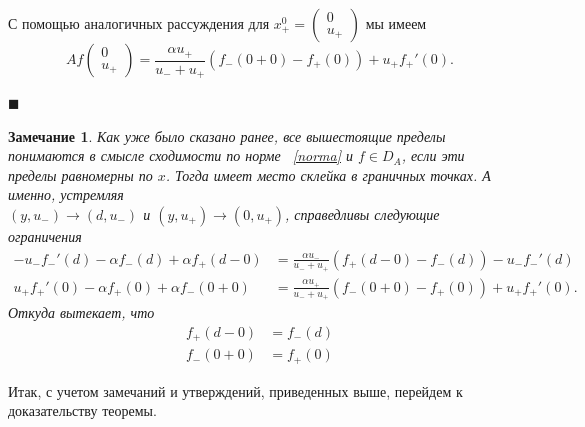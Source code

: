 \documentclass[12pt,a4paper]{article}
\newtheorem{zam}{Замечание}
\begin{document}
С помощью аналогичных рассуждения для $x_+^0 = \begin{pmatrix}
 0 \\
 u_+
\end{pmatrix}$ мы имеем
$$A f \begin{pmatrix}
 0 \\
 u_+
\end{pmatrix} = \frac{\alpha u_+}{u_- + u_+} (f_- (0 + 0) - f_+ (0)) + u_+ f_+' (0).$$
\begin{flushright}
$\blacksquare$
\end{flushright}

\begin{zam}
Как уже было сказано ранее, все вышестоящие пределы понимаются в смысле сходимости по норме ~\eqref{norma} и $f \in D_A$, если эти пределы равномерны по $x$. Тогда имеет место склейка в граничных точках. А именно, устремляя\\ $(y, u_-) \to (d, u_-)$ и
$(y, u_+) \to (0, u_+)$, справедливы следующие ограничения
\begin{equation*}
\begin{aligned} 
  -u_- f_-' (d) - \alpha f_- (d) + \alpha f_+ (d - 0) &= \frac{\alpha u_-}{u_- + u_+} (f_+ (d - 0) - f_- (d)) - u_- f_-' (d)\\
  u_+ f_+' (0) - \alpha f_+ (0) + \alpha f_- (0 + 0) &= \frac{\alpha u_+}{u_- + u_+} (f_- (0 + 0) - f_+ (0)) + u_+ f_+' (0).
\end{aligned}
\end{equation*}
Откуда вытекает, что
\begin{equation}\label{restrict}
\begin{aligned} 
  f_+ (d - 0) &= f_-(d)\\
  f_- (0 + 0) &= f_+(0)
\end{aligned}
\end{equation}
\end{zam}
Итак, с учетом замечаний и утверждений, приведенных выше, перейдем к доказательству теоремы.
\end{document}
